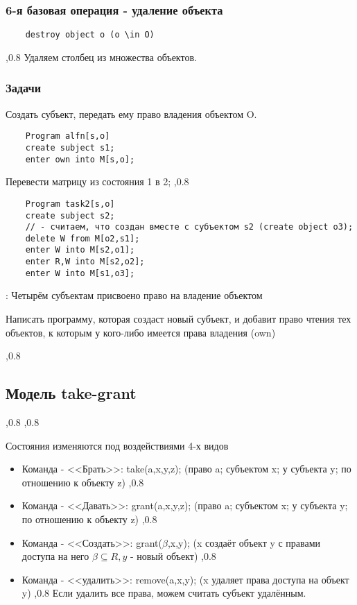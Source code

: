 \documentclass[a4paper,12pt]{report}
\begin{document}
	\subsubsection{6-я базовая операция - удаление объекта}
	\begin{verbatim}
	destroy object o (o \in O)
	\end{verbatim}
	,0.8
	Удаляем столбец из множества объектов.

	\subsubsection{Задачи}
	 Создать субъект, передать ему право владения объектом O.
	\begin{lstlisting}
	Program alfn[s,o]
	create subject s1;
	enter own into M[s,o];
	\end{lstlisting}

	 Перевести матрицу из состояния 1 в 2;
	,0.8
	\begin{lstlisting}
	Program task2[s,o]
	create subject s2;
	// - считаем, что создан вместе с субъектом s2 (create object o3);
	delete W from M[o2,s1];
	enter W into M[s2,o1];
	enter R,W into M[s2,o2];
	enter W into M[s1,o3];
	\end{lstlisting}

	: Четырём субъектам присвоено право на владение объектом

Написать программу, которая создаст новый субъект, и добавит право чтения тех объектов, к которым у кого-либо имеется права владения (own)

	,0.8

	\subsection{Модель take-grant}
	,0.8
	,0.8

	Состояния изменяются под воздействиями 4-х видов
	\begin{itemize}
		\item Команда  - <<Брать>>: take(a,x,y,z); (право a; субъектом x; у субъекта y; по отношению к объекту z)
		      ,0.8
		\item Команда  - <<Давать>>: grant(a,x,y,z); (право a; субъектом x; у субъекта y; по отношению к объекту z)
		      ,0.8
		\item Команда  - <<Создать>>: grant($\beta$,x,y); (x создаёт объект y с правами доступа на него $\beta \subseteq R, y$ - новый объект)
		      ,0.8
		\item Команда  - <<удалить>>: remove(a,x,y); (x удаляет права доступа на объект y)
		      ,0.8
		     Если удалить все права, можем считать субъект удалённым.
	\end{itemize}
\end{document}
